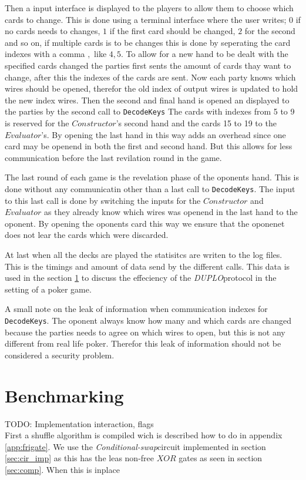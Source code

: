 \documentclass[twoside,11pt,openright]{report}
\newcommand{\todo}[1]{}
\renewcommand{\todo}[1]{{\color{red} TODO: {#1}} \\}
\newcommand{\CS}{\textit{Conditional-swap}}
\newcommand{\DUPLO}{\textit{DUPLO}}
\begin{document}
Then a input interface is displayed to the players to allow them to choose which cards to change. This is done using a terminal interface where the user writes; $0$ if no cards needs to changes, $1$ if the first card should be changed, $2$ for the second and so on, if multiple cards is to be changes this is done by seperating the card indexes with a comma $,$ like $4,5$. To allow for a new hand to be dealt with the specified cards changed the parties first sents the amount of cards thay want to change, after this the indexes of the cards are sent. Now each party knows which wires should be opened, therefor the old index of output wires is updated to hold the new index wires. Then the second and final hand is opened an displayed to the parties by the second call to \verb|DecodeKeys| The cards with indexes from 5 to 9 is reserved for the $Constructor$'s second hand and the cards 15 to 19 to the $Evaluator$'s. By opening the last hand in this way adds an overhead since one card may be openend in both the first and second hand. But this allows for less communication before the last revilation round in the game.

The last round of each game is the revelation phase of the oponents hand. This is done without any communicatin other than a last call to \verb|DecodeKeys|. The input to this last call is done by switching the inputs for the $Constructor$ and $Evaluator$ as they already know which wires was openend in the last hand to the oponent. By opening the oponents card this way we ensure that the oponenet does not lear the cards which were discarded.

At last when all the decks are played the statisitcs are writen to the log files. This is the timings and amount of data send by the different calls. This data is used in the section \ref{sec:bechmarking} to discuss the effeciency of the \DUPLO protocol in the setting of a poker game.

\bigskip

A small note on the leak of information when communication indexes for \verb|DecodeKeys|. The oponent always know how many and which cards are changed because the parties needs to agree on which wires to open, but this is not any different from real life poker. Therefor this leak of information should not be considered a security problem.


\section{Benchmarking}
\label{sec:bechmarking}
\todo{Implementation interaction, flags}
First a shuffle algorithm is compiled wich is described how to do in appendix \ref{app:frigate}. We use the \CS circuit implemented in section \ref{sec:cir_imp} as this has the leas non-free $XOR$ gates as seen in section \ref{sec:comp}. When this is inplace  
\end{document}
